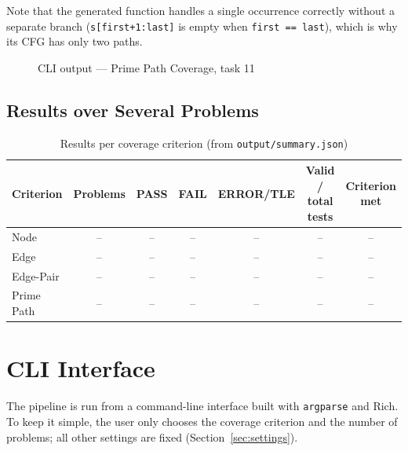 \documentclass[12pt, a4paper]{article}
\begin{document}
Note that the generated function handles a single occurrence correctly without a separate branch (\texttt{s[first+1:last]} is empty when \texttt{first == last}), which is why its CFG has only two paths.

\begin{figure}[H]
    \centering
    \caption{CLI output --- Prime Path Coverage, task 11}
\end{figure}

\subsection{Results over Several Problems}

\begin{table}[H]
    \centering
    \begin{tabular}{lcccccc}
        \toprule
        \textbf{Criterion} & \textbf{Problems} & \textbf{PASS} & \textbf{FAIL} & \textbf{ERROR/TLE} & \textbf{Valid / total tests} & \textbf{Criterion met} \\
        \midrule
        Node & -- & -- & -- & -- & -- & -- \\
        Edge & -- & -- & -- & -- & -- & -- \\
        Edge-Pair & -- & -- & -- & -- & -- & -- \\
        Prime Path & -- & -- & -- & -- & -- & -- \\
        \bottomrule
    \end{tabular}
    \caption{Results per coverage criterion (from \texttt{output/summary.json})}
\end{table}

\section{CLI Interface}

The pipeline is run from a command-line interface built with \texttt{argparse} and Rich. To keep it simple, the user only chooses the coverage criterion and the number of problems; all other settings are fixed (Section~\ref{sec:settings}).
\end{document}
